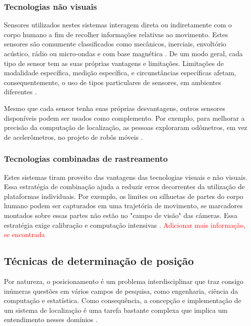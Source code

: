 \subsubsection{Tecnologias não visuais}\label{sec:tec-vis}
Sensores utilizados nestes sistemas interagem direta ou indiretamente com o corpo humano a fim de recolher informações relativas ao movimento. Estes sensores são comumente classificados como mecânicos, inerciais, envoltório acústico, rádio ou micro-ondas e com base magnética \cite{zhou2008human}. De um modo geral, cada tipo de sensor tem as suas próprias vantagens e limitações. Limitações de modalidade específica, medição específica, e circunstâncias específicas afetam, consequentemente, o uso de tipos particulares de sensores, em ambientes diferentes \cite{Welch:2002}.

Mesmo que cada sensor tenha suas próprias desvantagens, outros sensores disponíveis podem ser usados como complemento. Por exemplo, para melhorar a precisão da computação de localização, as pessoas exploraram odômetros, em vez de acelerômetros, no projeto de robôs móveis \cite{zhou2008human}.

\subsubsection{Tecnologias combinadas de rastreamento}\label{sec:rastre-robo}
Estes sistemas tiram proveito das vantagens das tecnologias visuais e não visuais. Essa estratégia de combinação ajuda a reduzir erros decorrentes da utilização de plataformas individuais. Por exemplo, os limites ou silhuetas de partes do corpo humano podem ser capturados em uma trajetória de movimento, se marcadores montados sobre essas partes não estão no "campo de visão" das câmeras. Essa estratégia exige calibração e computação intensivas \cite{zhou2008human}.
\textcolor{red}{Adicionar mais informação, se encontrada}


\subsection{Técnicas de determinação de posição}\label{sec:determ-posic}
Por natureza, o posicionamento é um problema interdisciplinar que traz consigo inúmeras questões em vários campos de pesquisa, como engenharia, ciência da computação e estatística. Como consequência, a concepção e implementação de um sistema de localização é uma tarefa bastante complexa que implica um entendimento nesses domínios \cite{linde2006aspects}. 

